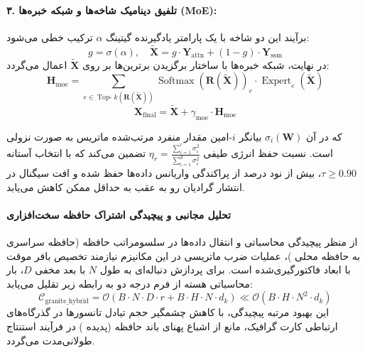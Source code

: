 \paragraph{۳. تلفیق دینامیک شاخه‌ها و شبکه خبره‌ها (MoE):}
برآیند این دو شاخه با یک پارامتر یادگیرنده گیتینگ $\alpha$ ترکیب خطی می‌شود:
\begin{equation}
g = \sigma(\alpha), \quad \tilde{\mathbf{X}} = g \cdot \mathbf{Y}_{\text{attn}} + (1 - g) \cdot \mathbf{Y}_{\text{ssm}}
\end{equation}
در نهایت، شبکه خبره‌ها با ساختار برگزیدن برترین‌ها  بر روی $\tilde{\mathbf{X}}$ اعمال می‌گردد:
\begin{equation}
\mathbf{H}_{\text{moe}} = \sum_{e \in \operatorname{Top-}k(\mathbf{R}(\tilde{\mathbf{X}}))} \operatorname{Softmax}(\mathbf{R}(\tilde{\mathbf{X}}))_e \cdot \operatorname{Expert}_e(\tilde{\mathbf{X}})
\end{equation}
\begin{equation}
\mathbf{X}_{\text{final}} = \tilde{\mathbf{X}} + \gamma_{\text{moe}} \cdot \mathbf{H}_{\text{moe}}
\end{equation}

که در آن $\sigma_i(\mathbf{W})$ بیانگر $i$-امین مقدار منفرد مرتب‌شده ماتریس به صورت نزولی است. نسبت حفظ انرژی طیفی $\eta_r = \frac{\sum_{i=1}^r \sigma_i^2}{\sum_{i=1}^{d} \sigma_i^2}$ تضمین می‌کند که با انتخاب آستانه $\tau \ge 0.90$، بیش از نود درصد از پراکندگی واریانس داده‌ها حفظ شده و افت سیگنال در انتشار گرادیان رو به عقب به حداقل ممکن کاهش می‌یابد.

\paragraph{تحلیل مجانبی و پیچیدگی اشتراک حافظه سخت‌افزاری}
از منظر پیچیدگی محاسباتی و انتقال داده‌ها در سلسومراتب حافظه (حافظه سراسری  به حافظه محلی )، عملیات ضرب ماتریسی در این مکانیزم نیازمند تخصیص بافر موقت با ابعاد فاکتورگیری‌شده است. برای پردازش دنباله‌ای به طول $N$ با بعد مخفی $D$، بار محاسباتی هسته از فرم درجه دو به رابطه زیر تقلیل می‌یابد:
\begin{equation}
\label{eq:complexity_granite_hybrid}
\mathcal{C}_{\text{granite\_hybrid}} = \mathcal{O}\left( B \cdot N \cdot D \cdot r + B \cdot H \cdot N \cdot d_k \right) \ll \mathcal{O}\left( B \cdot H \cdot N^2 \cdot d_k \right)
\end{equation}
این بهبود مرتبه پیچیدگی، با کاهش چشمگیر حجم تبادل تانسورها در گذرگاه‌های ارتباطی کارت گرافیک، مانع از اشباع پهنای باند حافظه (پدیده ) در فرآیند استنتاج طولانی‌مدت می‌گردد.
